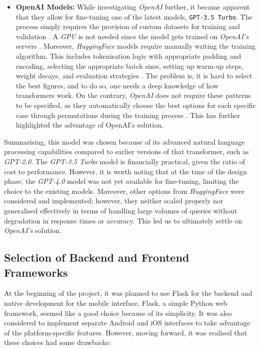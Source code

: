 \begin{itemize}
    \item \textbf{OpenAI Models:} While investigating \textit{OpenAI} further, it became apparent that they allow for fine-tuning one of the latest models, \texttt{GPT-3.5 Turbo}. The process simply requires the provision of custom datasets for training and validation \cite{LatifEtAl2024, OpenAIDocumentation2023}. A \textit{GPU} is not needed since the model gets trained on \textit{OpenAI's} servers \cite{ChatGPTFineTuning2024, OpenAIDocumentation2023}. Moreover, \textit{HuggingFace} models require manually writing the training algorithm. This includes tokenisation logic with appropriate padding and encoding, selecting the appropriate batch sizes, setting up warm-up steps, weight decays, and evaluation strategies \cite{NarayananEtAl2023}. The problem is, it is hard to select the best figures, and to do so, one needs a deep knowledge of how transformers work. On the contrary, \textit{OpenAI} does not require these patterns to be specified, as they automatically choose the best options for each specific case through permutations during the training process \cite{OpenAIDocumentation2023}. This has further highlighted the advantage of OpenAI's solution.
\end{itemize}

Summarising, this model was chosen because of its advanced natural language processing capabilities compared to earlier versions of that transformer, such as \textit{GPT-2.0}. The \textit{GPT-3.5 Turbo} model is financially practical, given the ratio of cost to performance. However, it is worth noting that at the time of the design phase, the \textit{GPT-4.0} model was not yet available for fine-tuning, limiting the choice to the existing models. Moreover, other options from \textit{HuggingFace} were considered and implemented; however, they neither scaled properly nor generalised effectively in terms of handling large volumes of queries without degradation in response times or accuracy. This led us to ultimately settle on \textit{OpenAI's} solution.  
        
\subsection{Selection of Backend and Frontend Frameworks}

At the beginning of the project, it was planned to use Flask for the backend and native development for the mobile interface. Flask, a simple Python web framework, seemed like a good choice because of its simplicity. It was also considered to implement separate Android and iOS interfaces to take advantage of the platform-specific features. However, moving forward, it was realised that these choices had some drawbacks:


